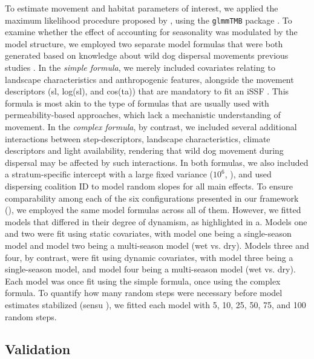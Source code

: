 \documentclass[../FinalThesis.tex]{subfiles}
\begin{document}
To estimate movement and habitat parameters of interest, we applied the maximum
likelihood procedure proposed by \citet{Muff.2020}, using the \texttt{glmmTMB}
package \citep{Brooks.2017}. To examine whether the effect of accounting for
seasonality was modulated by the model structure, we employed two separate model
formulas that were both generated based on knowledge about wild dog dispersal
movements previous studies \citep{Hofmann.2021, Hofmann.2023}. In the
\textit{simple formula}, we merely included covariates relating to landscape
characteristics and anthropogenic features, alongside the movement descriptors
(sl, log(sl), and cos(ta)) that are mandatory to fit an iSSF \citep{Avgar.2017,
Fieberg.2021}. This formula is most akin to the type of formulas that are
usually used with permeability-based approaches, which lack a mechanistic
understanding of movement. In the \textit{complex formula}, by contrast, we
included several additional interactions between step-descriptors, landscape
characteristics, climate descriptors and light availability, rendering that wild
dog movement during dispersal may be affected by such interactions. In both
formulas, we also included a stratum-specific intercept with a large fixed
variance ($10^6$, \citealp{Muff.2020}), and used dispersing coalition ID to
model random slopes for all main effects. To ensure comparability among each of
the six configurations presented in our framework (),
we employed the same model formulas across all of them. However, we fitted
models that differed in their degree of dynamism, as highlighted in
a. Models one and two were fit using static
covariates, with model one being a single-season model and model two being a
multi-season model (wet vs. dry). Models three and four, by contrast, were fit
using dynamic covariates, with model three being a single-season model, and
model four being a multi-season model (wet vs. dry). Each model was once fit
using the simple formula, once using the complex formula. To quantify how many
random steps were necessary before model estimates stabilized (sensu
\citealp{Fieberg.2021}), we fitted each model with 5, 10, 25, 50, 75, and 100
random steps.

\subsection{Validation}
\end{document}
